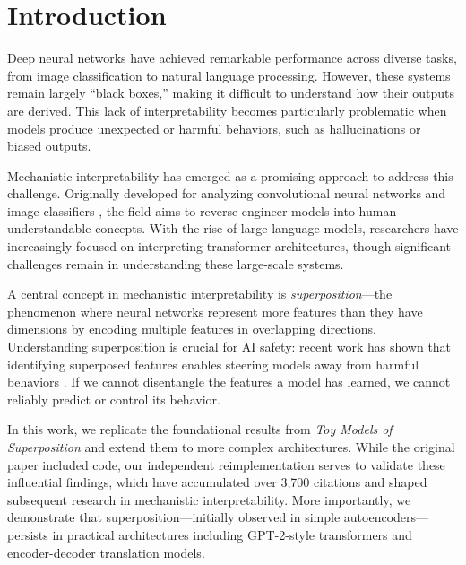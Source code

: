 \section{Introduction}

Deep neural networks have achieved remarkable performance across diverse tasks, from image classification to natural language processing. However, these systems remain largely ``black boxes,'' making it difficult to understand how their outputs are derived. This lack of interpretability becomes particularly problematic when models produce unexpected or harmful behaviors, such as hallucinations or biased outputs.

Mechanistic interpretability has emerged as a promising approach to address this challenge. Originally developed for analyzing convolutional neural networks and image classifiers \citep{olah2017feature, cammarata2020thread}, the field aims to reverse-engineer models into human-understandable concepts. With the rise of large language models, researchers have increasingly focused on interpreting transformer architectures, though significant challenges remain in understanding these large-scale systems.

A central concept in mechanistic interpretability is \emph{superposition}---the phenomenon where neural networks represent more features than they have dimensions by encoding multiple features in overlapping directions. Understanding superposition is crucial for AI safety: recent work has shown that identifying superposed features enables steering models away from harmful behaviors \citep{templeton2024scaling}. If we cannot disentangle the features a model has learned, we cannot reliably predict or control its behavior.

In this work, we replicate the foundational results from \emph{Toy Models of Superposition} \citep{elhage2022toy} and extend them to more complex architectures. While the original paper included code, our independent reimplementation serves to validate these influential findings, which have accumulated over 3,700 citations and shaped subsequent research in mechanistic interpretability. More importantly, we demonstrate that superposition---initially observed in simple autoencoders---persists in practical architectures including GPT-2-style transformers and encoder-decoder translation models.

